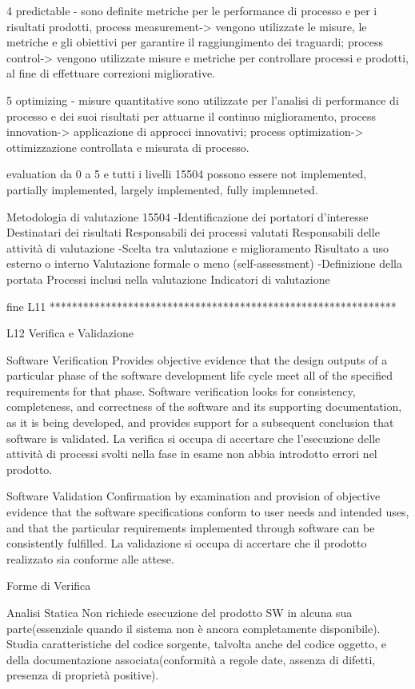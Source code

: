 \documentclass{report}
\begin{document}
4 predictable - sono definite metriche per le performance di processo e per i risultati prodotti,
process measurement-> vengono utilizzate le misure, le metriche e gli obiettivi per garantire il raggiungimento dei traguardi;
process control-> vengono utilizzate misure e metriche per controllare processi e prodotti, al fine di effettuare correzioni migliorative.

5 optimizing - misure quantitative sono utilizzate per l’analisi di performance di processo e dei suoi risultati per attuarne il continuo miglioramento,
process innovation-> applicazione di approcci innovativi;
process optimization-> ottimizzazione controllata e misurata di processo.

evaluation da 0 a 5 e tutti i livelli 15504 possono essere 
not implemented, partially implemented, largely implemented, fully implemneted.

Metodologia di valutazione 15504
-Identificazione dei portatori d’interesse
 Destinatari dei risultati
 Responsabili dei processi valutati
 Responsabili delle attività di valutazione
-Scelta tra valutazione e miglioramento
 Risultato a uso esterno o interno
 Valutazione formale o meno (self-assessment)
-Definizione della portata
 Processi inclusi nella valutazione
 Indicatori di valutazione

fine L11
**************************************************************

L12 Verifica e Validazione

Software Verification
Provides objective evidence that the design outputs of a particular phase of the software development life cycle meet all of the specified requirements for that phase.
Software verification looks for consistency, completeness, and correctness of the software and its supporting documentation, as it
is being developed, and provides support for a subsequent conclusion that software is validated.
La verifica si  occupa di accertare che l'esecuzione delle attività di processi svolti nella fase in esame non abbia introdotto errori nel prodotto.

Software Validation
Confirmation by examination and provision of objective evidence that the software specifications conform to user needs and intended uses, and that the particular requirements implemented through software can be consistently fulfilled.
La validazione si occupa di accertare che il prodotto realizzato sia conforme alle attese.

Forme di Verifica

Analisi Statica
Non richiede esecuzione del prodotto SW in alcuna sua parte(essenziale quando il sistema non è ancora completamente disponibile).
Studia caratteristiche del codice sorgente, talvolta anche del codice oggetto, e della documentazione associata(conformità a regole date, assenza di difetti, presenza di proprietà positive).
\end{document}
